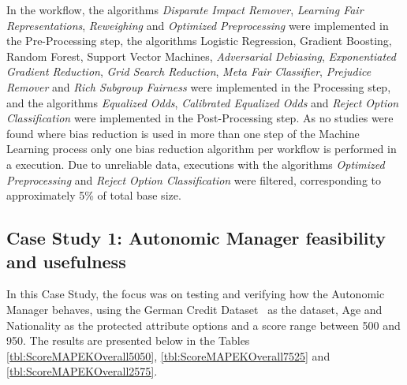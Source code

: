 \documentclass[sigconf]{acmart}
\begin{document}
In the workflow, the algorithms \textit{Disparate Impact Remover}, \textit{Learning Fair Representations}, \textit{Reweighing} and \textit{Optimized Preprocessing} were implemented in the Pre-Processing step, the algorithms Logistic Regression, Gradient Boosting, Random Forest, Support Vector Machines, \textit{Adversarial Debiasing}, \textit{Exponentiated Gradient Reduction}, \textit{Grid Search Reduction}, \textit{Meta Fair Classifier}, \textit{Prejudice Remover} and \textit{Rich Subgroup Fairness} were implemented in the Processing step, and the algorithms \textit{Equalized Odds}, \textit{Calibrated Equalized Odds} and \textit{Reject Option Classification} were implemented in the Post-Processing step. As no studies were found where bias reduction is used in more than one step of the Machine Learning process only one bias reduction algorithm per workflow is performed in a execution. Due to unreliable data, executions with the algorithms \textit{Optimized Preprocessing} and \textit{Reject Option Classification} were filtered, corresponding to approximately 5\% of total base size.

\subsection{Case Study 1: Autonomic Manager feasibility and usefulness}

In this Case Study, the focus was on testing and verifying how the Autonomic Manager behaves, using the German Credit Dataset~\citep{ucigerman_2021} as the dataset, Age and Nationality as the protected attribute options and a score range between 500 and 950. The results are presented below in the Tables \ref{tbl:ScoreMAPEKOverall5050}, \ref{tbl:ScoreMAPEKOverall7525} and \ref{tbl:ScoreMAPEKOverall2575}.
\end{document}
